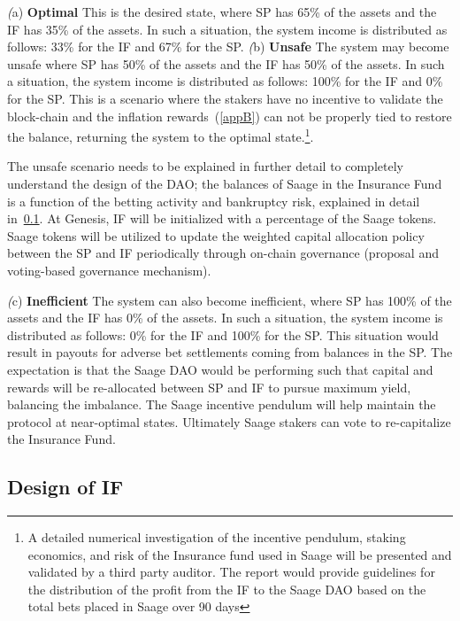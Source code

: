 \documentclass[%
 reprint,
 amsmath,amssymb,
 aps,
]{revtex4-2}
\begin{document}
\textit(a) \textbf{Optimal} This is the desired state, where SP has 65\% of the assets and the IF has 35\% of the assets. In such a situation, the system income is distributed as follows: 33\% for the IF and 67\% for the SP. 
\textit(b) \textbf{Unsafe} The system may become unsafe where SP has 50\% of the assets and the IF has 50\% of the assets. In such a situation, the system income is distributed as follows: 100\% for the IF and 0\% for the SP. This is a scenario where the stakers have no incentive to validate the block-chain and the inflation rewards~(\ref{appB}) can not be properly tied to restore the balance, returning the system to the optimal state.\footnote{A detailed numerical investigation of the incentive pendulum, staking economics, and risk of the Insurance fund used in Saage will be presented and validated by a third party auditor. The report would provide guidelines for the distribution of the profit from the IF to the Saage DAO based on the total bets placed in Saage over 90 days}. 


The unsafe scenario needs to be explained in further detail to completely understand the design of the DAO; the balances of Saage in the Insurance Fund is a function of the betting activity and bankruptcy risk, explained in detail in~\ref{slushfund}. At Genesis, IF will be initialized with a percentage of the Saage tokens. Saage tokens will be utilized to update the weighted capital allocation policy between the SP and IF periodically through on-chain governance (proposal and voting-based governance mechanism). 

\textit(c) \textbf{Inefficient} The system can also become inefficient, where SP has 100\% of the assets and the IF has 0\% of the assets. In such a situation, the system income is distributed as follows: 0\% for the IF and 100\% for the SP. This situation would result in payouts for adverse bet settlements coming from balances in the SP. The expectation is that the Saage DAO would be performing such that capital and rewards will be re-allocated between SP and IF to pursue maximum yield, balancing the imbalance. The Saage incentive pendulum will help maintain the protocol at near-optimal states.  Ultimately Saage stakers can vote to re-capitalize the Insurance Fund.

\subsection{Design of IF}\label{slushfund}
\end{document}
